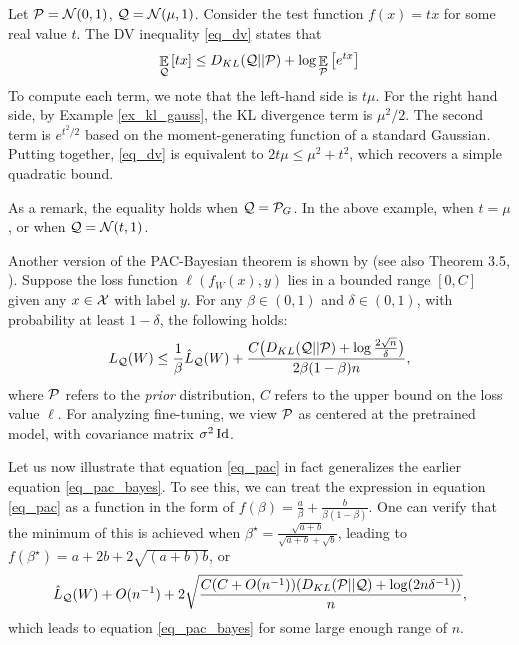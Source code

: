 \begin{example}
    Let $\mathcal{P} = \mathcal{N}(0, 1)$, $\mathcal{Q} = \mathcal{N}(\mu, 1)$.
    Consider the test function $f(x) = t x$ for some real value $t$.
    The DV inequality \eqref{eq_dv} states that
    \[ \mathop{\mathbb{E}}_{\mathcal{Q}}\left[ tx \right] \le D_{KL}(\mathcal{Q} || \mathcal{P}) + \log \mathop{\mathbb{E}}_{\mathcal{P}}\left[ e^{tx} \right] \]
    To compute each term, we note that the left-hand side is $t \mu$.
    For the right hand side, by Example \ref{ex_kl_gauss}, the KL divergence term is $\mu^2 / 2$.
    The second term is $e^{t^2 / 2}$ based on the moment-generating function of a standard Gaussian.
    Putting together, \eqref{eq_dv} is equivalent to $2 t \mu \le \mu^2 + t^2$, which recovers a simple quadratic bound.

    As a remark, the equality holds when $\mathcal{Q} = \mathcal{P}_G$.
    In the above example, when $t = \mu$, or when $\mathcal{Q} = \mathcal{N}(t, 1)$.
\end{example}

Another version of the PAC-Bayesian theorem is shown by \cite{catoni2007pac} (see also Theorem 3.5, \cite{alquier2021user}).
Suppose the loss function $\ell(f_W(x),y)$ lies in a bounded range $[0, C]$ given any $x\in\mathcal{X}$ with label $y$.
For any $\beta\in (0,1)$ and $\delta\in (0,1)$, with probability at least $1-\delta$, the following holds:
\begin{equation}
    L_{\mathcal{Q}}(W)\leq \frac{1}{\beta}\hat{L}_{\mathcal{Q}}(W) + \frac{C \big(D_{KL}(\mathcal{Q}||\mathcal{P})+\log\frac{2 \sqrt n}{\delta}\big)}{2\beta(1-\beta)n}, \label{eq_pac}
\end{equation}
where $\mathcal{P}$ refers to the \textit{prior} distribution, $C$ refers to the upper bound on the loss value $\ell$.
For analyzing fine-tuning, we view $\mathcal{P}$ as centered at the pretrained model, with covariance matrix $\sigma^2 \operatorname{Id}$.

\begin{remark}
    Let us now illustrate that equation \eqref{eq_pac} in fact generalizes the earlier equation \eqref{eq_pac_bayes}.
    To see this, we can treat the expression in equation \eqref{eq_pac} as a function in the form of $f(\beta) = \frac a {\beta} + \frac b {\beta (1 - \beta)}$. One can verify that the minimum of this is achieved when $\beta^{\star} = \frac{ \sqrt{a + b} } {\sqrt{a + b} + \sqrt{b}}$, leading to $f(\beta^{\star}) = a + 2b + 2 \sqrt{(a + b) b}$, or
    \[ \hat L_{\mathcal{Q}} (W) + O(n^{-1}) + 2 \sqrt{ \frac {C (C + O(n^{-1}) ) (D_{KL}(\mathcal{P} || \mathcal{Q}) + \log(2n \delta^{-1})) } {n} }, \]
    which leads to equation \eqref{eq_pac_bayes} for some large enough range of $n$.
\end{remark}

